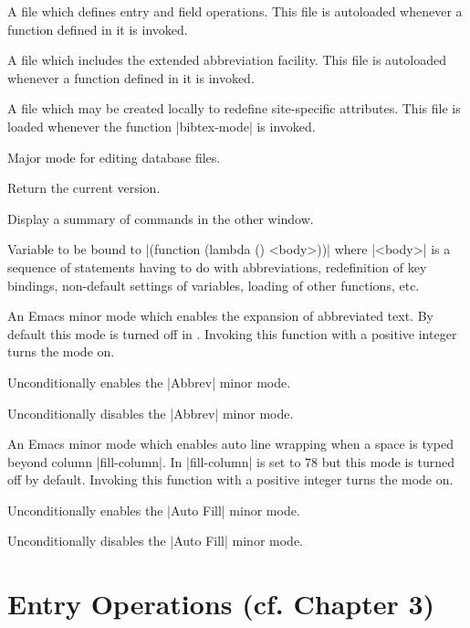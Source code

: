 A {\BM} file which defines entry and field operations.
This file is autoloaded whenever a function defined in it is invoked.

A {\BM} file which includes the extended abbreviation facility.
This file is autoloaded whenever a function defined in it is invoked.

A file which may be created locally to redefine site-specific attributes.
This file is loaded whenever the function |bibtex-mode| is invoked.

Major mode for editing {\BibTeX} database files.

Return the current {\BM} version.

Display a summary of {\BM} commands in the other window.

Variable to be bound to |(function (lambda () <body>))|
where |<body>| is a sequence of statements having to do with
abbreviations, redefinition of key bindings, non-default
settings of {\BM} variables, loading of other functions, etc.

An Emacs minor mode which enables the expansion of abbreviated text.
By default this mode is turned off in {\BM}.
Invoking this function with a positive integer turns the mode on.

Unconditionally enables the |Abbrev| minor mode.

Unconditionally disables the |Abbrev| minor mode.

An Emacs minor mode which enables auto line wrapping when a space
is typed beyond column |fill-column|.
In {\BM} |fill-column| is set to 78 but this mode is turned off by default.
Invoking this function with a positive integer turns the mode on.

Unconditionally enables the |Auto Fill| minor mode.

Unconditionally disables the |Auto Fill| minor mode.


\section{Entry Operations (cf. Chapter 3)}

